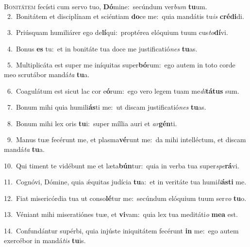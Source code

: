 \lettrine{\initial\textcolor{\initialcolor}{B}}{onitátem} fecísti cum servo tuo, \textbf{Dó}\-mine:~\star secúndum ver\textit{bum} \textbf{tu}\-um.\\
{\numbfont\textcolor{\numbcolor}{~2.}}~Bonitátem et disciplínam et sciéntiam \textbf{do}\-ce me:~\star quia mandátis tu\textit{is} \textbf{cré}\-\textbf{di}di.\par
{\numbfont\textcolor{\numbcolor}{~3.}}~Priúsquam humiliárer ego de\-\textbf{lí}\-qui:~\star proptérea elóquium tuum cus\-\textit{to}\-\textbf{dí}vi.\par
{\numbfont\textcolor{\numbcolor}{~4.}}~Bonus \textbf{es} tu:~\star et in bonitáte tua doce me justificatió\textit{nes} \textbf{tu}\-as.\par
{\numbfont\textcolor{\numbcolor}{~5.}}~Multiplicáta est super me iníquitas super\-\textbf{bó}\-rum:~\star ego autem in toto corde meo scrutábor mandá\textit{ta} \textbf{tu}\-a.\par
{\numbfont\textcolor{\numbcolor}{~6.}}~Coagulátum est sicut lac cor e\-\textbf{ó}\-rum:~\star ego vero legem tuam me\-\textit{di}\-\textbf{tá}\textbf{tus} sum.\par
{\numbfont\textcolor{\numbcolor}{~7.}}~Bonum mihi quia humili\-\textbf{ás}\-ti me:~\star ut discam justificatió\textit{nes} \textbf{tu}\-as.\par
{\numbfont\textcolor{\numbcolor}{~8.}}~Bonum mihi lex oris \textbf{tu}\-i:~\star super míllia auri et \textit{ar}\-\textbf{gén}ti.\par
{\numbfont\textcolor{\numbcolor}{~9.}}~Manus tuæ fecérunt me, et plasma\-\textbf{vé}\-runt me:~\star da mihi intelléctum, et discam mandá\textit{ta} \textbf{tu}\-a.\par
{\numbfont\textcolor{\numbcolor}{10.}}~Qui timent te vidébunt me et læta\-\textbf{bún}\-tur:~\star quia in verba tua super\-\textit{spe}\-\textbf{rá}vi.\par
{\numbfont\textcolor{\numbcolor}{11.}}~Cognóvi, Dómine, quia ǽquitas judícia \textbf{tu}\-a:~\star et in veritáte tua humi\-\textit{li}\-\textbf{ás}\textbf{ti} me.\par
{\numbfont\textcolor{\numbcolor}{12.}}~Fiat misericórdia tua ut conso\-\textbf{lé}\-tur me:~\star secúndum elóquium tuum ser\textit{vo} \textbf{tu}\-o.\par
{\numbfont\textcolor{\numbcolor}{13.}}~Véniant mihi miseratiónes tuæ, et \textbf{vi}\-vam:~\star quia lex tua meditáti\textit{o} \textbf{me}\-\textbf{a} est.\par
{\numbfont\textcolor{\numbcolor}{14.}}~Confundántur supérbi, quia injúste iniquitátem fecérunt \textbf{in} me:~\star ego autem exercébor in mandá\textit{tis} \textbf{tu}\-is.\par
